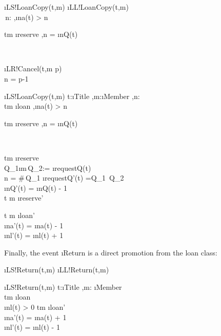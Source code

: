 \documentclass[12pt,a4paper]{article}
\begin{document}
\begin{showspecs}
	\begin{spec}{\i{LS!LoanCopy(t,m)}}
		\i{LL!LoanCopy(t,m)}\\
		\,n: \sep \i{na}(t) > n\\
		\begin{alt}
			t\mapsto m \notin \i{reserve} \sep n = \i{nQ}(t)
		\end{alt}\\
		\begin{alt}
			\!\i{LR!Cancel}(t,m \to p)\\
			n = p-1
		\end{alt}
	\end{spec}
\showbeside
	\begin{spec}[\equiv]{\i{LS!LoanCopy(t,m)}}
		t:\i{Title} \sep m:\i{Member} \sep n: \p{NAT}\\
		t\mapsto m \notin \i{loan} \sep \i{na}(t) > n\\
		\begin{alt}
			t\mapsto m \notin \i{reserve} \sep n = \i{nQ}(t)
		\end{alt}\\
		\begin{alt}
			t\mapsto m \in \i{reserve}\\
			Q_1\langle\i{m}\rangle\,Q_2:= \i{requestQ}(t)\\
            n = \#\,Q_1
		\post
			\i{requestQ'}(t) =\;Q_1 \langle\rangle\,Q_2\\	
			\i{nQ'(t)} = \i{nQ(t)} - 1\\
			t \mapsto m \notin \i{reserve'}
		\end{alt}
	\post	t \mapsto m \in \i{loan'}\\
		\i{na'}(t) = \i{na}(t) - 1\\
		\i{nl'}(t) = \i{nl}(t) + 1
	\end{spec}
\end{showspecs}

\bigskip\noindent Finally, the event \i{Return} is a direct promotion from the loan class:
\begin{showspecs}
	\begin{spec}{\i{LS!Return(t,m)}}
		\i{LL!Return(t,m)}
	\end{spec}
\showbeside
	\begin{spec}[\equiv]{\i{LS!Return(t,m)}}
		t:\i{Title} \sep m: \i{Member}\\
		t\mapsto m \in \i{loan}\\
        \i{nl}(t) > 0
	\post	t\mapsto m \notin \i{loan'}\\
		\i{na'}(t) = \i{na}(t) + 1\\
		\i{nl'}(t) = \i{nl}(t) - 1
	\end{spec}
\end{showspecs}
\end{document}
